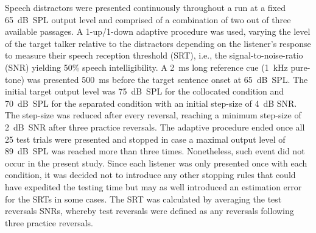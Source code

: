 \documentclass[a4paper, twoside]{templates/ociamthesis}
\begin{document}
Speech distractors were presented continuously throughout a run at a fixed 65~dB~SPL output level and comprised of a combination of two out of three available passages. A 1-up/1-down adaptive procedure was used, varying the level of the target talker relative to the distractors depending on the listener's response to measure their speech reception threshold (SRT), i.e., the signal-to-noise-ratio (SNR) yielding 50\% speech intelligibility. A 2~ms long reference cue (1~kHz pure-tone) was presented 500~ms before the target sentence onset at 65~dB~SPL. The initial target output level was 75~dB~SPL for the collocated condition and 70~dB~SPL for the separated condition with an initial step-size of 4~dB SNR. The step-size was reduced after every reversal, reaching a minimum step-size of 2~dB~SNR after three practice reversals. The adaptive procedure ended once all 25 test trials were presented and stopped in case a maximal output level of 89~dB~SPL was reached more than three times. Nonetheless, such event did not occur in the present study. Since each listener was only presented once with each condition, it was decided not to introduce any other stopping rules that could have expedited the testing time but may as well introduced an estimation error for the SRTs in some cases. The SRT was calculated by averaging the test reversals SNRs, whereby test reversals were defined as any reversals following three practice reversals.\\
\end{document}
